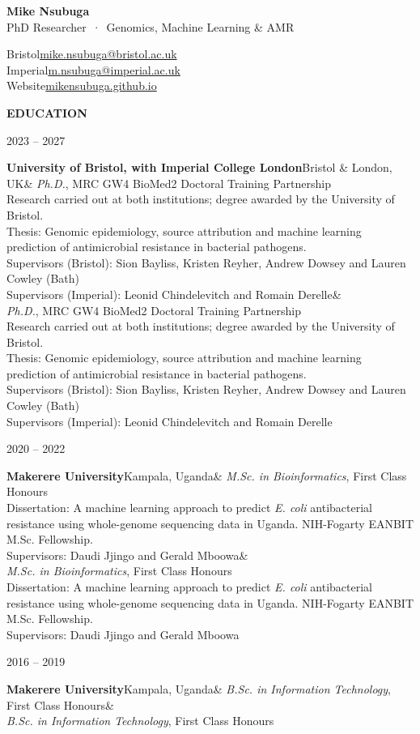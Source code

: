 \documentclass[10pt]{article}
\newlength{\datecol}\setlength{\datecol}{2.6cm}   %
\newlength{\sectiongap}\setlength{\sectiongap}{20pt}  %
\newlength{\headinggap}\setlength{\headinggap}{7pt}   %
\newlength{\entrygap}\setlength{\entrygap}{10pt}       %
\newlength{\titlegap}\setlength{\titlegap}{1pt}       %
\renewcommand{\section}[1]{%
  \par\addvspace{\sectiongap}%
  {\headfont\bfseries\color{accent}\addfontfeatures{LetterSpace=8}\MakeUppercase{#1}}%
  \hspace{0.6em}{\color{rulecol}\leaders\hrule height 0.5pt depth 0pt\hfill}\par\nopagebreak\addvspace{\headinggap}}
\newcommand{\entry}[4]{%
  \par\addvspace{\entrygap}%
  \noindent\parbox[t]{\datecol}{\raggedright\leavevmode\headfont\small\color{muted}#1}%
  \parbox[t]{\dimexpr\linewidth-\datecol\relax}{\raggedright\leavevmode
    \textbf{#2}\hfill{\small\color{muted}#3}\ifx&#4&\else\\[\titlegap]#4\fi}%
  \par\addvspace{\entrygap}}
\newcommand{\role}[1]{\textit{#1}}
\newcommand{\detail}[1]{{\small\color{muted}#1}}
\begin{document}
\begin{minipage}[b]{0.55\linewidth}
  {\headfont\fontsize{26}{30}\selectfont\bfseries Mike Nsubuga}\\[4pt]
  {\headfont\color{accent}PhD Researcher \,·\, Genomics, Machine Learning \& AMR}
\end{minipage}\hfill
\begin{minipage}[b]{0.44\linewidth}\raggedleft\small
  {\headfont\footnotesize\color{muted}Bristol}\enspace\href{mailto:mike.nsubuga@bristol.ac.uk}{mike.nsubuga@bristol.ac.uk}\\
  {\headfont\footnotesize\color{muted}Imperial}\enspace\href{mailto:m.nsubuga@imperial.ac.uk}{m.nsubuga@imperial.ac.uk}\\
  {\headfont\footnotesize\color{muted}Website}\enspace\href{https://mikensubuga.github.io/}{mikensubuga.github.io}
\end{minipage}
\par{}\vspace{2pt}

\section{Education}
\entry{2023 -- 2027}{University of Bristol, \textmd{with} Imperial College London}{Bristol \& London, UK}{%
  \role{Ph.D.}, MRC GW4 BioMed2 Doctoral Training Partnership\\
  \detail{Research carried out at both institutions; degree awarded by the University of Bristol.}\\
  \detail{Thesis: Genomic epidemiology, source attribution and machine learning prediction of antimicrobial resistance in bacterial pathogens.}\\
  \detail{Supervisors (Bristol): Sion Bayliss, Kristen Reyher, Andrew Dowsey and Lauren Cowley (Bath)}\\
  \detail{Supervisors (Imperial): Leonid Chindelevitch and Romain Derelle}}
\entry{2020 -- 2022}{Makerere University}{Kampala, Uganda}{%
  \role{M.Sc. in Bioinformatics}, First Class Honours\\
  \detail{Dissertation: A machine learning approach to predict \textit{E. coli} antibacterial resistance using whole-genome sequencing data in Uganda. NIH-Fogarty EANBIT M.Sc. Fellowship.}\\
  \detail{Supervisors: Daudi Jjingo and Gerald Mboowa}}
\entry{2016 -- 2019}{Makerere University}{Kampala, Uganda}{%
  \role{B.Sc. in Information Technology}, First Class Honours}
\end{document}
